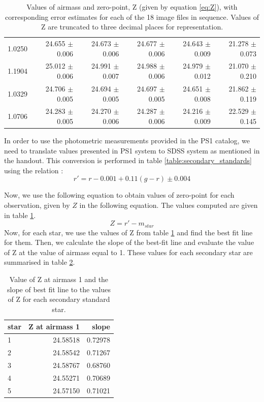 \documentclass{tda}
\begin{document}
\begin{table}
\begin{tabular} {l r r r r r}
			1.0250 & 24.655 \(\pm\) 0.006 & 24.673 \(\pm\) 0.006 & 24.677 \(\pm\) 0.006 & 24.643 \(\pm\) 0.009 & 21.278 \(\pm\)  0.073 \\
			1.1904 & 25.012 \(\pm\) 0.006 & 24.991 \(\pm\) 0.007 & 24.988 \(\pm\) 0.006 & 24.979 \(\pm\) 0.012 & 21.070 \(\pm\)  0.210 \\
			1.0329 & 24.706 \(\pm\) 0.005 & 24.694 \(\pm\) 0.005 & 24.697 \(\pm\) 0.005 & 24.651 \(\pm\) 0.008 & 21.862 \(\pm\)  0.119 \\
			1.0706 & 24.283 \(\pm\) 0.005 & 24.270 \(\pm\) 0.006 & 24.287 \(\pm\) 0.006 & 24.216 \(\pm\) 0.009 & 22.529 \(\pm\)  0.145 \\
			\bottomrule
		\end{tabular}
		\caption{Values of airmass and zero-point, Z (given by equation \ref{eq:Z}), with corresponding error estimates for each of the 18 image files in sequence. Values of Z are truncated to three decimal places for representation.}
		\label{table:Z_airmass}
	\end{table}



	In order to use the photometric measurements provided in the PS1 catalog, we need to translate values presented in PS1 system to SDSS system as mentioned in the handout. This conversion is performed in table \ref{table:secondary_standards} using the relation \citep{2012ApJ...750...99T}:
	 \begin{equation}
	 	r' = r-0.001+0.11(g-r) \pm 0.004
	 \end{equation} 

	Now, we use the following equation to obtain values of zero-point for each observation, given by \(Z\) in the following equation. The values computed are given in table \ref{table:Z_airmass}.
	\begin{equation}
	 	Z = r' - m_{star}
	 	\label{eq:Z}
	\end{equation} 
	Now, for each star, we use the values of Z from table \ref{table:Z_airmass} and find the best fit line for them. Then, we calculate the slope of the best-fit line and evaluate the value of Z at the value of airmass equal to 1. These values for each secondary star are summarised in table \ref{table:slope_Z1}.

	\begin{table}
		\centering
		\begin{tabular} {l r r}
			\toprule
			\textbf{star} & \textbf{Z at airmass 1} & \textbf{slope} \\
			\midrule
			1 & 24.58518 & 0.72978 \\
			2 & 24.58542 & 0.71267 \\
			3 & 24.58767 & 0.68760 \\
			4 & 24.55271 & 0.70689 \\
			5 & 24.57150 & 0.71021\\
			\bottomrule
		\end{tabular}
		\caption{Value of Z at airmass 1 and the slope of best fit line to the values of Z for each secondary standard star.}
		\label{table:slope_Z1}
	\end{table}
\end{document}
